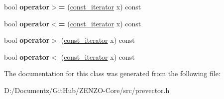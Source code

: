 \begin{DoxyCompactItemize}
\item 
\mbox{\label{classprevector_1_1const__iterator_a9312691e9a5a8097034ffb23b6b6745c}} 
bool {\bfseries operator$>$=} (\mbox{\hyperlink{classprevector_1_1const__iterator}{const\+\_\+iterator}} x) const
\item 
\mbox{\label{classprevector_1_1const__iterator_a4ceaac998a4face78b7a2041023281f1}} 
bool {\bfseries operator$<$=} (\mbox{\hyperlink{classprevector_1_1const__iterator}{const\+\_\+iterator}} x) const
\item 
\mbox{\label{classprevector_1_1const__iterator_aed6699768819221696f4e2b6db2b9a0f}} 
bool {\bfseries operator$>$} (\mbox{\hyperlink{classprevector_1_1const__iterator}{const\+\_\+iterator}} x) const
\item 
\mbox{\label{classprevector_1_1const__iterator_a2cdb51fc23c60a20dc5e954f6cc2a127}} 
bool {\bfseries operator$<$} (\mbox{\hyperlink{classprevector_1_1const__iterator}{const\+\_\+iterator}} x) const
\end{DoxyCompactItemize}


The documentation for this class was generated from the following file\+:\begin{DoxyCompactItemize}
\item 
D\+:/\+Documentz/\+Git\+Hub/\+Z\+E\+N\+Z\+O-\/\+Core/src/prevector.\+h\end{DoxyCompactItemize}
